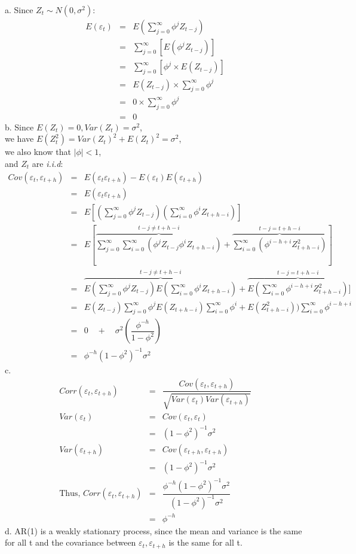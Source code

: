\documentclass[12pt, utf8]{article}
\begin{document}
a.
Since $Z_t \sim N(0, \sigma^2) $:
\begin{eqnarray}
E(\varepsilon_t) &=& E(\sum_{j = 0}^\infty \phi^j Z_{t-j} ) \\
&=& \sum_{j = 0}^\infty [E(\phi^j Z_{t-j} )] \\
&=& \sum_{j = 0}^\infty [\phi^j \times E(Z_{t-j})] \\
&=& E(Z_{t-j}) \times \sum_{j = 0}^\infty \phi^j  \\
&=& 0 \times \sum_{j = 0}^\infty \phi^j \\
&=& 0
\end{eqnarray}
b. Since $ E(Z_t) = 0, Var(Z_t) = \sigma^2$, \\
we have $ E(Z_t^2) = Var(Z_t)^2 + E(Z_t)^2 = \sigma^2 $, \\
we also know that $ \left| \phi \right| < 1 $, \\
and $Z_t$ are \textit{i.i.d}:
\begin{eqnarray}
Cov(\varepsilon_t , \varepsilon_{t+h}) &=& 	E(\varepsilon_t \varepsilon_{t+h}) - E(\varepsilon_t)E(\varepsilon_{t+h}) \\
&=& E(\varepsilon_t \varepsilon_{t+h}) \\
&=& E[(\sum_{j = 0}^\infty \phi^j Z_{t-j}) (\sum_{i = 0}^\infty \phi^i Z_{t+h-i})] \\ 
&=& E[\overbrace{\sum_{j = 0}^\infty \sum_{i = 0}^\infty (\phi^j Z_{t-j} \phi^i Z_{t+h-i})}^{t-j \neq t+h - i} + \overbrace{\sum_{i = 0}^\infty (\phi^{i - h + i} Z_{t+h-i}^2) }^{t-j = t+h -i} ] \\
&=& \overbrace{ E(\sum_{j = 0}^\infty  \phi^j Z_{t-j})E(\sum_{i = 0}^\infty \phi^i Z_{t+h-i})}^{t-j \neq t+h - i} + \overbrace{E (\sum_{i = 0}^\infty \phi^{i - h + i} Z_{t+h-i}^2)}^{t-j = t+h -i} ] \\
&=&  E(Z_{t-j}) \sum_{j = 0}^\infty \phi^j E(Z_{t+h-i}) \sum_{i = 0}^\infty \phi^i + E(Z_{t+h-i}^2)) \sum_{i = 0}^\infty \phi^{i - h + i} \\
&=& 0 \quad + \quad \sigma^2 (\dfrac{\phi^{-h}}{1 - \phi^2}) \\
&=& \phi^{-h}(1- \phi^2)^{-1}\sigma^2
\end{eqnarray}
c. 
\begin{eqnarray}
Corr(\varepsilon_t , \varepsilon_{t+h}) &=& \dfrac{Cov(\varepsilon_t , \varepsilon_{t+h})}{\sqrt{Var(\varepsilon_t)Var(\varepsilon_{t+h})}} \\ 
Var(\varepsilon_t) &=& Cov(\varepsilon_t , \varepsilon_t) \\
&=& (1- \phi^2)^{-1}\sigma^2 \\ 
Var(\varepsilon_{t+h}) &=& Cov(\varepsilon_{t+h}, \varepsilon_{t+h}) \\ 
&=& (1- \phi^2)^{-1}\sigma^2 \\ 
\text{Thus, } Corr(\varepsilon_t , \varepsilon_{t+h}) &=& \dfrac{\phi^{-h}(1- \phi^2)^{-1}\sigma^2}{(1- \phi^2)^{-1}\sigma^2} \\
&=& \phi^{-h}
\end{eqnarray}
d. AR(1) is a weakly stationary process, since the mean and variance is the same for all t and the covariance between $ \varepsilon_t , \varepsilon_{t+h}$ is the same for all t. 
\end{document}
